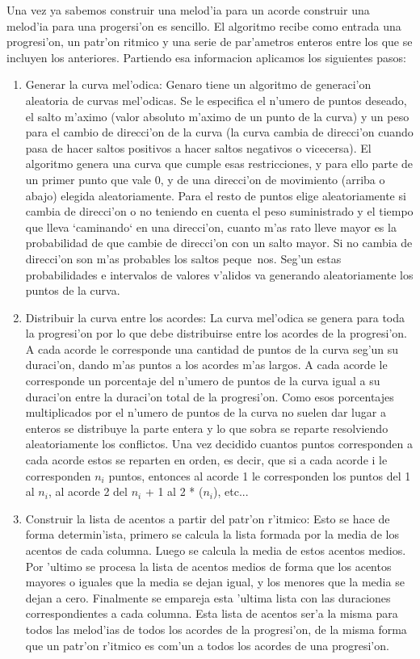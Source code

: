 Una vez ya sabemos construir una melod'ia para un acorde construir una melod'ia para una progersi'on es sencillo. El algoritmo recibe como entrada una progresi'on, un patr'on ritmico y una serie de par'ametros enteros entre los que se incluyen los anteriores. Partiendo esa informacion aplicamos los siguientes pasos:
        \begin{enumerate}
        \item Generar la curva mel'odica: Genaro tiene un algoritmo de generaci'on aleatoria de curvas mel'odicas. Se le especifica el n'umero de puntos deseado, el salto m'aximo (valor absoluto m'aximo de un punto de la curva) y un peso para el cambio de direcci'on de la curva (la curva cambia de direcci'on cuando pasa de hacer saltos positivos a hacer saltos negativos o vicecersa). El algoritmo genera una curva que cumple esas restricciones, y para ello parte de un primer punto que vale 0, y de una direcci'on de movimiento (arriba o abajo) elegida aleatoriamente. Para el resto de puntos elige aleatoriamente si cambia de direcci'on o no teniendo en cuenta el peso suministrado y el tiempo que lleva `caminando` en una direcci'on, cuanto m'as rato lleve mayor es la probabilidad de que cambie de direcci'on con un salto mayor. Si no cambia de direcci'on son m'as probables los saltos peque~nos. Seg'un estas probabilidades e intervalos de valores v'alidos va generando aleatoriamente los puntos de la curva.
        \item Distribuir la curva entre los acordes: La curva mel'odica se genera para toda la progresi'on por lo que debe distribuirse entre los acordes de la progresi'on. A cada acorde le corresponde una cantidad de puntos de la curva seg'un su duraci'on, dando m'as puntos a los acordes m'as largos. A cada acorde le corresponde un porcentaje del n'umero de puntos de la curva igual a su duraci'on entre la duraci'on total de la progresi'on. Como esos porcentajes multiplicados por el n'umero de puntos de la curva no suelen dar lugar a enteros se distribuye la parte entera y lo que sobra se reparte resolviendo aleatoriamente los conflictos. Una vez decidido cuantos puntos corresponden a cada acorde estos se reparten en orden, es decir, que si a cada acorde i le corresponden $n_{i}$ puntos, entonces al acorde 1 le corresponden los puntos del 1 al $n_{i}$, al acorde 2 del $n_{i}$ + 1 al 2 * ($n_{i}$), etc...
	\item Construir la lista de acentos a partir del patr'on r'itmico: Esto se hace de forma determin'ista, primero se calcula la lista formada por la media de los acentos de cada columna. Luego se calcula la media de estos acentos medios. Por 'ultimo se procesa la lista de acentos medios de forma que los acentos mayores o iguales que la media se dejan igual, y los menores que la media se dejan a cero. Finalmente se empareja esta 'ultima lista con las duraciones correspondientes a cada columna. Esta lista de acentos ser'a la misma para todos las melod'ias de todos los acordes de la progresi'on, de la misma forma que un patr'on r'itmico es com'un a todos los acordes de una progresi'on.

\end{enumerate}
